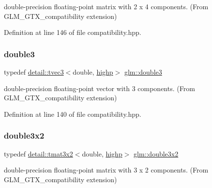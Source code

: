 double-\/precision floating-\/point matrix with 2 x 4 components. (From G\+L\+M\+\_\+\+G\+T\+X\+\_\+compatibility extension) 



Definition at line 146 of file compatibility.\+hpp.

\mbox{\label{group__gtx__compatibility_ga3b94d4a19ca0272cad6e025fc5150d06}} 
\subsubsection{\texorpdfstring{double3}{double3}}
{\footnotesize\ttfamily typedef \hyperlink{structglm_1_1detail_1_1tvec3}{detail\+::tvec3}$<$double, \hyperlink{namespaceglm_a0f04f086094c747d227af4425893f545ac6f7eab42eacbb10d59a58e95e362074}{highp}$>$ \hyperlink{group__gtx__compatibility_ga3b94d4a19ca0272cad6e025fc5150d06}{glm\+::double3}}



double-\/precision floating-\/point vector with 3 components. (From G\+L\+M\+\_\+\+G\+T\+X\+\_\+compatibility extension) 



Definition at line 140 of file compatibility.\+hpp.

\mbox{\label{group__gtx__compatibility_ga1f70107ac850f512ac4e09737e1f85b7}} 
\subsubsection{\texorpdfstring{double3x2}{double3x2}}
{\footnotesize\ttfamily typedef \hyperlink{structglm_1_1detail_1_1tmat3x2}{detail\+::tmat3x2}$<$double, \hyperlink{namespaceglm_a0f04f086094c747d227af4425893f545ac6f7eab42eacbb10d59a58e95e362074}{highp}$>$ \hyperlink{group__gtx__compatibility_ga1f70107ac850f512ac4e09737e1f85b7}{glm\+::double3x2}}



double-\/precision floating-\/point matrix with 3 x 2 components. (From G\+L\+M\+\_\+\+G\+T\+X\+\_\+compatibility extension) 



